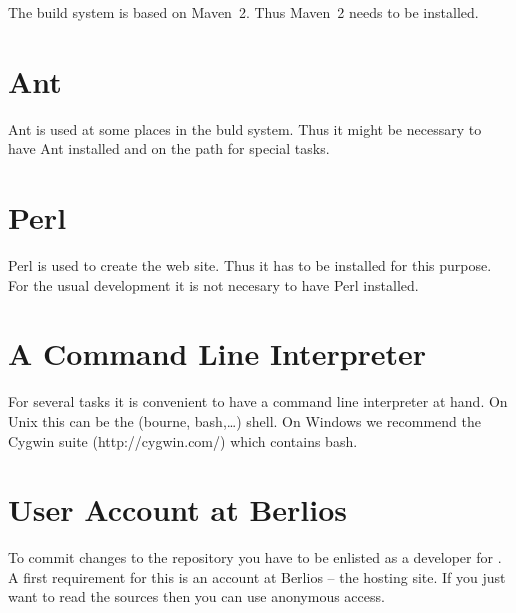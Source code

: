 The build system is based on Maven~2. Thus Maven~2 needs to be
installed.



\section{Ant}

Ant is used at some places in the buld system. Thus it might be
necessary to have Ant installed and on the path for special tasks.


\section{Perl}

Perl is used to create the web site. Thus it has to be installed for this
purpose. For the usual development it is not necesary to have Perl installed.


\section{A Command Line Interpreter}

For several tasks it is convenient to have a command line interpreter
at hand. On Unix this can be the (bourne, bash,\ldots) shell. On Windows
we recommend the Cygwin suite (http://cygwin.com/) which contains bash.


\section{User Account at Berlios}

To commit changes to the repository you have to be enlisted as a
developer for \ExTeX. A first requirement for this is an account at
Berlios -- the hosting site. If you just want to read the sources then
you can use anonymous access.

